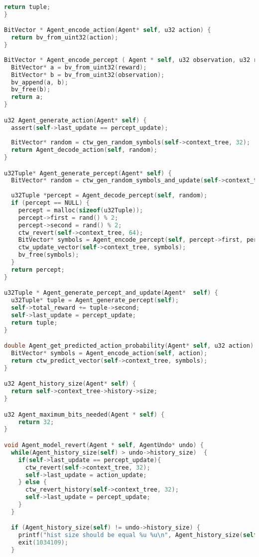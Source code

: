 \documentclass[fancychapters]{report}   	%
\begin{document}
\begin{lstlisting}[language=C,caption={agent.c}]
  return tuple;
}

BitVector * Agent_encode_action(Agent* self, u32 action) {
  return bv_from_uint32(action);
}
  
BitVector * Agent_encode_percept ( Agent * self, u32 observation, u32 reward) {
  BitVector* a = bv_from_uint32(reward);
  BitVector* b = bv_from_uint32(observation);
  bv_append(a, b);
  bv_free(b);
  return a;
}

u32 Agent_generate_action(Agent* self) {
  assert(self->last_update == percept_update);
  
  BitVector* random = ctw_gen_random_symbols(self->context_tree, 32);
  return Agent_decode_action(self, random);
}

u32Tuple* Agent_generate_percept(Agent* self) {
  BitVector* random = ctw_gen_random_symbols_and_update(self->context_tree, 64);
  
  u32Tuple *percept = Agent_decode_percept(self, random);
  if (percept == NULL) {
    percept = malloc(sizeof(u32Tuple));
    percept->first = rand() % 2;
    percept->second = rand() % 2;
    ctw_revert(self->context_tree, 64);
    BitVector* symbols = Agent_encode_percept(self, percept->first, percept->second);
    ctw_update_vector(self->context_tree, symbols);
    bv_free(symbols);
  }
  return percept;
}

u32Tuple * Agent_generate_percept_and_update(Agent*  self) {
  u32Tuple* tuple = Agent_generate_percept(self);
  self->total_reward += tuple->second;
  self->last_update = percept_update;
  return tuple;
}

double Agent_get_predicted_action_probability(Agent* self, u32 action) {
  BitVector* symbols = Agent_encode_action(self, action);
  return ctw_predict_vector(self->context_tree, symbols);
}

u32 Agent_history_size(Agent* self) {
  return self->context_tree->history->size;
}

u32 Agent_maximum_bits_needed(Agent * self) {
    return 32;
}

void Agent_model_revert(Agent * self, AgentUndo* undo) {
  while(Agent_history_size(self) > undo->history_size)  {
    if(self->last_update == percept_update){
      ctw_revert(self->context_tree, 32);
      self->last_update = action_update;
    } else {
      ctw_revert_history(self->context_tree, 32);
      self->last_update = percept_update;
    }
  }

  if (Agent_history_size(self) != undo->history_size) {
    printf("hist size should be equal %u %u\n", Agent_history_size(self), undo->history_size);
    exit(1034109);
  }
  

\end{lstlisting}
\end{document}
